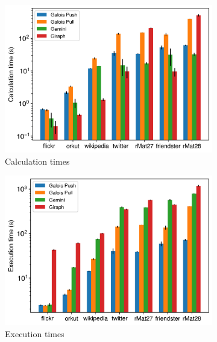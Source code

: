 \begin{figure}[h]
	\centering
	\begin{subfigure}{0.32\textwidth}
		\includegraphics[width=\linewidth]{../../plots/distributedSSSP_calcTime.png}
		\caption{Calculation times}
		\label{fig:distributedSSSP_calc}
	\end{subfigure}
	\hfil
	\begin{subfigure}{0.32\textwidth}
		\includegraphics[width=\linewidth]{../../plots/distributedSSSP_execTime.png}
		\caption{Execution times}
		\label{fig:distributedSSSP_exec}
	\end{subfigure}
	\hfil
	\begin{subfigure}{0.32\textwidth}

\end{subfigure}
\end{figure}
